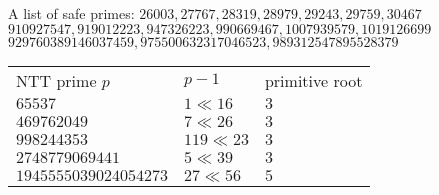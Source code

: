 A list of safe primes:
$26003, 27767, 28319, 28979, 29243, 29759, 30467$ \\
$910927547, 919012223, 947326223, 990669467, 1007939579, 1019126699$ \\
$929760389146037459, 975500632317046523, 989312547895528379$ \\
\begin{tabular}{|l|l|l|}
    NTT prime $p$         & $p - 1$      & primitive root   \\
    $65537$               & $1 \ll 16$   & $3$              \\
    $469762049$           & $7 \ll 26$   & $3$              \\
    $998244353$           & $119 \ll 23$ & $3$              \\
    $2748779069441$       & $5 \ll 39$   & $3$              \\
    $1945555039024054273$ & $27 \ll 56$  & $5$              \\
\end{tabular}
